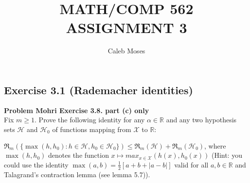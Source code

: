 \documentclass[
10pt, %
a4paper, %
oneside, %
headinclude,footinclude, %
BCOR5mm, %
]{scrartcl}
\title{\normalfont\spacedallcaps{Language reclamation: Literature review}} %
\author{\spacedlowsmallcaps{Caleb Moses*}} %
\date{} %
\title{MATH/COMP 562 ASSIGNMENT 3}
\author{Caleb Moses}
\newenvironment{problem}[2][Problem]
               { \begin{mdframed}[backgroundcolor=gray!20] \textbf{#1 #2} \\}
               {  \end{mdframed}}
\begin{document}
\maketitle



\subsection*{Exercise 3.1 (Rademacher identities)}
\begin{problem}{Mohri Exercise 3.8. part (c) only}
Fix $m \geq 1$. Prove the following identity for any $\alpha \in \mathbb{R}$ and any two hypothesis sets $\mathcal{H}$ and $\mathcal{H}_0$ of functions mapping from $\mathcal{X}$ to $\mathbb{R}$:

$\mathfrak{R}_m(\{\max(h, h_0 ): h \in \mathcal{H}, h_0 \in \mathcal{H}_0 \}) \leq \mathfrak{R}_m (\mathcal{H}) + \mathfrak{R}_m (\mathcal{H}_0)$, where $\max(h, h_0 )$ denotes the function $x \mapsto max_{x\in \mathcal{X}} (h(x), h_0 (x))$ (Hint: you could use the identity $\max(a, b) = \frac{1}{2} [a + b + |a - b|]$ valid for all $a, b \in \mathbb{R}$ and Talagrand’s contraction lemma (see lemma 5.7)).
\end{problem}
\end{document}
